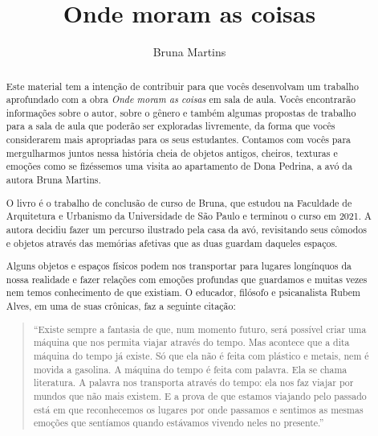 \documentclass[11pt]{extarticle}
\newcommand{\AutorLivro}{Bruna Martins}
\newcommand{\TituloLivro}{Onde moram as coisas}
\newcommand{\colaborador}{Gabriela Karam}
\begin{document}
\title{\TituloLivro}
\author{\AutorLivro}
\def\authornotes{\colaborador}

\date{}
\maketitle


\tableofcontents


\begin{abstract}

Este material tem a intenção de contribuir para que vocês desenvolvam um trabalho aprofundado com a obra \textit{Onde moram as coisas} em sala de aula.
Vocês encontrarão informações sobre o autor, sobre o gênero e também 
algumas propostas de trabalho para a sala de aula que poderão ser exploradas livremente, 
da forma que vocês considerarem mais apropriadas para os seus estudantes. Contamos com vocês para mergulharmos juntos nessa história cheia de objetos antigos, cheiros, texturas e emoções como se fizéssemos uma visita ao apartamento de Dona Pedrina, a avó da autora Bruna Martins. 

O livro é o trabalho de conclusão de curso de Bruna, que estudou na Faculdade de Arquitetura e Urbanismo da Universidade de São Paulo e terminou o curso em 2021. A autora decidiu fazer um percurso ilustrado pela casa da avó, revisitando seus cômodos e objetos através das memórias afetivas que as duas guardam daqueles espaços. 

Alguns objetos e espaços físicos podem nos transportar para lugares longínquos da nossa realidade e fazer relações com emoções profundas que guardamos e muitas vezes nem temos conhecimento de que existiam. O educador, filósofo e psicanalista Rubem Alves, em uma de suas crônicas, faz a seguinte citação:

\begin{quote}

``Existe sempre a fantasia de que, num momento futuro, será possível criar uma máquina que nos permita viajar através do tempo. Mas acontece que a dita máquina do tempo já existe. Só que ela não é feita com plástico e metais, nem é movida a gasolina. A máquina do tempo é feita com palavra. Ela se chama literatura. A palavra nos transporta através do tempo: ela nos faz viajar por mundos que não mais existem. E a prova de que estamos viajando pelo passado está em que reconhecemos os lugares por onde passamos e sentimos as mesmas emoções que sentíamos quando estávamos vivendo neles no presente.''


\end{quote}
\end{abstract}
\end{document}

